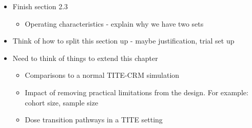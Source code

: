 \newpage 
\begin{itemize}
	\item Finish section 2.3
	\begin{itemize}
		\item Operating characteristics - explain why we have two sets 
	\end{itemize}
	\item Think of how to split this section up - maybe justification, trial set up 
	\item Need to think of things to extend this chapter 
	\begin{itemize}
		\item Comparisons to a normal TITE-CRM simulation 
		\item Impact of removing practical limitations from the design. For example: cohort size, sample size 
		\item Dose transition pathways in a TITE setting  
	\end{itemize}
\end{itemize}





